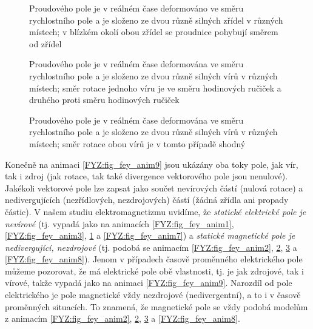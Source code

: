     \begin{figure}[ht!]
      \centering
      \caption{Proudového pole je v reálném čase deformováno ve směru rychlostního pole a je 
               složeno ze dvou různě silných zřídel v různých místech; v blízkém okolí obou zřídel 
               se proudnice pohybují směrem od zřídel}
      \label{FYZ:fig_fey_anim4}
    \end{figure} 

    \begin{figure}[ht!]
      \centering  
      \caption{Proudového pole je v reálném čase deformována ve směru rychlostního pole a je 
               složeno ze dvou různě silných vírů v různých místech; směr rotace jednoho víru je ve 
               směru hodinových ručiček a druhého proti směru hodinových ručiček}
      \label{FYZ:fig_fey_anim5}
    \end{figure} 

    \begin{figure}[ht!]
      \centering
      \caption{Proudového pole je v reálném čase deformována ve směru rychlostního pole a je  
               složeno ze dvou různě silných vírů v různých místech; směr rotace obou vírů je v 
               tomto případě shodný}
      \label{FYZ:fig_fey_anim6}
    \end{figure} 
    
    Konečně na animaci \ref{FYZ:fig_fey_anim9} jsou ukázány oba toky pole, jak vír, tak i zdroj 
    (jak rotace, tak také divergence vektorového pole jsou nenulové). Jakékoli vektorové pole lze 
    zapsat jako součet nevírových částí (nulová rotace) a nedivergujících (nezřídlových, 
    nezdrojových) částí (žádná zřídla ani propady částic). V našem studiu elektromagnetizmu 
    uvidíme, že\emph{ statické elektrické pole je nevírové} (tj. vypadá jako na animacích 
    \ref{FYZ:fig_fey_anim1}, \ref{FYZ:fig_fey_anim3}, \ref{FYZ:fig_fey_anim4} a 
    \ref{FYZ:fig_fey_anim7}) a \emph{statické magnetické pole je nedivergující, nezdrojové} (tj. 
    podobá se animacím \ref{FYZ:fig_fey_anim2}, \ref{FYZ:fig_fey_anim5}, \ref{FYZ:fig_fey_anim6} a 
    \ref{FYZ:fig_fey_anim8}). Jenom v případech časově proměnného elektrického pole můžeme 
    pozorovat, že má elektrické pole obě vlastnosti, tj. je jak zdrojové, tak i vírové, takže 
    vypadá jako na animaci \ref{FYZ:fig_fey_anim9}. Narozdíl od pole elektrického je pole 
    magnetické vždy nezdrojové (nedivergentní), a to i v časově proměnných situacích. To znamená, 
    že magnetické pole se vždy podobá modelům z animacím \ref{FYZ:fig_fey_anim2}, 
    \ref{FYZ:fig_fey_anim5}, \ref{FYZ:fig_fey_anim6} a \ref{FYZ:fig_fey_anim8}.              
    
